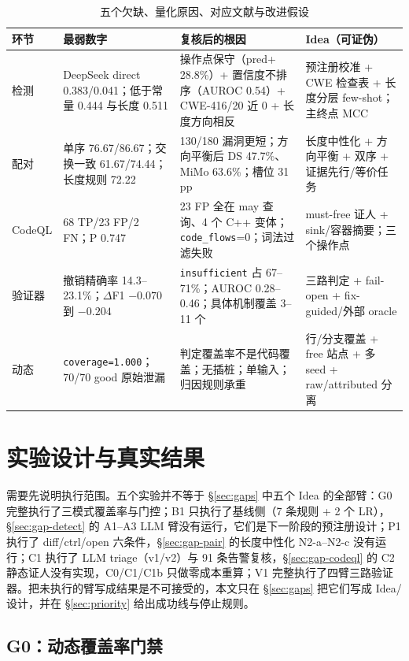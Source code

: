 \documentclass[conference]{IEEEtran}
\begin{document}
\begin{table}[t]
\centering
\caption{五个欠缺、量化原因、对应文献与改进假设}
\label{tab:gapmap}
\footnotesize
\setlength{\tabcolsep}{4pt}
\begin{tabular}{@{}p{2.1cm}p{4.2cm}p{4.6cm}p{5.2cm}@{}}
\toprule
环节 & 最弱数字 & 复核后的根因 & Idea（可证伪） \\
\midrule
检测 & DeepSeek direct 0.383/0.041；低于常量 0.444 与长度 0.511 & 操作点保守（pred+ 28.8\%）+ 置信度不排序（AUROC 0.54）+ CWE-416/20 近 0 + 长度方向相反 & 预注册校准 + CWE 检查表 + 长度分层 few-shot；主终点 MCC \\
配对 & 单序 76.67/86.67；交换一致 61.67/74.44；长度规则 72.22 & 130/180 漏洞更短；方向平衡后 DS 47.7\%、MiMo 63.6\%；槽位 31 pp & 长度中性化 + 方向平衡 + 双序 + 证据先行/等价任务 \\
CodeQL & 68 TP/23 FP/2 FN；P 0.747 & 23 FP 全在 may 查询、4 个 C++ 变体；\texttt{code\_flows}=0；词法过滤失败 & must-free 证人 + sink/容器摘要；三个操作点 \\
验证器 & 撤销精确率 14.3--23.1\%；$\Delta$F1 $-0.070$ 到 $-0.204$ & \texttt{insufficient} 占 67--71\%；AUROC 0.28--0.46；具体机制覆盖 3--11 个 & 三路判定 + fail-open + fix-guided/外部 oracle \\
动态 & \texttt{coverage=1.000}；70/70 good 原始泄漏 & 判定覆盖率不是代码覆盖；无插桩；单输入；归因规则承重 & 行/分支覆盖 + free 站点 + 多 seed + raw/attributed 分离 \\
\bottomrule
\end{tabular}
\end{table}

\section{实验设计与真实结果}
\label{sec:results}

需要先说明执行范围。五个实验并不等于 §\ref{sec:gaps} 中五个 Idea 的全部臂：G0 完整执行了三模式覆盖率与门控；B1 只执行了基线侧（7 条规则 + 2 个 LR），§\ref{sec:gap-detect} 的 A1--A3 LLM 臂没有运行，它们是下一阶段的预注册设计；P1 执行了 diff/ctrl/open 六条件，§\ref{sec:gap-pair} 的长度中性化 N2-a--N2-c 没有运行；C1 执行了 LLM triage（v1/v2）与 91 条告警复核，§\ref{sec:gap-codeql} 的 C2 静态证人没有实现，C0/C1/C1b 只做零成本重算；V1 完整执行了四臂三路验证器。把未执行的臂写成结果是不可接受的，本文只在 §\ref{sec:gaps} 把它们写成 Idea/设计，并在 §\ref{sec:priority} 给出成功线与停止规则。

\subsection{G0：动态覆盖率门禁}
\label{sec:g0}
\end{document}
